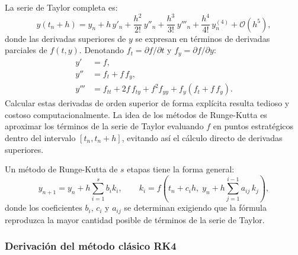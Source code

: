 \documentclass[10pt,onecolumn]{article}
\begin{document}
La serie de Taylor completa es:
\begin{equation}
    y(t_n+h) = y_n + h\,y'_n + \frac{h^2}{2!}\,y''_n + \frac{h^3}{3!}\,y'''_n + \frac{h^4}{4!}\,y^{(4)}_n + \mathcal{O}(h^5),
\end{equation}
donde las derivadas superiores de $y$ se expresan en términos de derivadas parciales de $f(t,y)$. Denotando $f_t = \partial f/\partial t$ y $f_y = \partial f/\partial y$:
\begin{align}
    y' &= f, \label{eq:d1}\\
    y'' &= f_t + f\,f_y, \label{eq:d2}\\
    y''' &= f_{tt} + 2f\,f_{ty} + f^2\!f_{yy} + f_y(f_t + f\,f_y). \label{eq:d3}
\end{align}
Calcular estas derivadas de orden superior de forma explícita resulta tedioso y costoso computacionalmente. La idea de los métodos de Runge-Kutta es aproximar los términos de la serie de Taylor evaluando $f$ en puntos estratégicos dentro del intervalo $[t_n, t_n+h]$, evitando así el cálculo directo de derivadas superiores.

Un método de Runge-Kutta de $s$ etapas tiene la forma general:
\begin{equation}
    y_{n+1} = y_n + h\sum_{i=1}^{s} b_i k_i, \qquad k_i = f\!\left(t_n + c_i h,\; y_n + h\sum_{j=1}^{i-1} a_{ij}\, k_j\right),
\end{equation}
donde los coeficientes $b_i$, $c_i$ y $a_{ij}$ se determinan exigiendo que la fórmula reproduzca la mayor cantidad posible de términos de la serie de Taylor.

\subsubsection*{Derivación del método clásico RK4}
\end{document}

